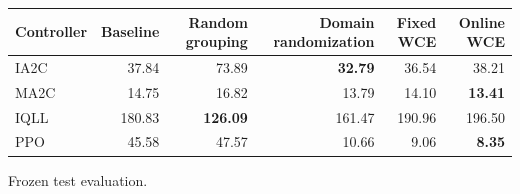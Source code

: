 \begin{tabular}{lrrrrr}
\hline
Controller & Baseline & Random grouping & Domain randomization & Fixed WCE & Online WCE \\
\hline
IA2C & 37.84 & 73.89 & \textbf{32.79} & 36.54 & 38.21 \\
MA2C & 14.75 & 16.82 & 13.79 & 14.10 & \textbf{13.41} \\
IQLL & 180.83 & \textbf{126.09} & 161.47 & 190.96 & 196.50 \\
PPO & 45.58 & 47.57 & 10.66 & 9.06 & \textbf{8.35} \\
\hline
\end{tabular}
Frozen test evaluation.
